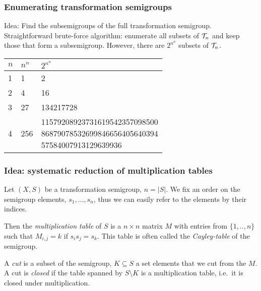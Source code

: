 \documentclass{beamer}
\newcommand{\cT}{{\cal T}}
\newcommand{\jump}{\vskip6pt}
\begin{document}
\begin{frame}\frametitle{Enumerating transformation semigroups}
Idea: Find the subsemigroups of the full transformation semigroup.
\jump
Straightforward brute-force algorithm: enumerate all subsets of $\cT_n$ and keep those that form a subsemigroup.
\jump
However, there are $2^{n^n}$ subsets of $\cT_n$.
\begin{center}
\renewcommand{\arraystretch}{1.5}

\begin{tabular}{l|l|l}
$n$&$n^n$&$2^{n^n}$\\
\hline
1 & 1 & 2 \\
\hline
2 & 4 & 16 \\
\hline
3 & 27 & 134217728 \\
\hline\hline\hline
4 & 256 & \parbox[l]{.5\textwidth}{11579208923731619542357098500\\86879078532699846656405640394\\57584007913129639936}\\
 & 3125 & $2^{3125}$
\end{tabular}
\end{center}
\end{frame}

\begin{frame}\frametitle{Idea: systematic reduction of multiplication tables}
Let $(X,S)$ be a transformation semigroup, $n=|S|$. We fix an order on the semigroup elements, $s_1,\ldots, s_n$, thus we can easily refer to the elements by their indices. 
\begin{definition}
Then the  \emph{multiplication table} of $S$ is a $n\times n$ matrix $M$ with entries from $\{1,..,n\}$ such that $M_{i,j}=k$ if $s_is_j=s_k$. This table is often called the \emph{Cayley-table} of the semigroup.
\end{definition}

\begin{definition}
A \emph{cut} is a subset of the semigroup, $K\subseteq S$ a set elements that we cut from the $M$.  A cut is \emph{closed} if the table spanned by $S\setminus K$ is a multiplication table, i.e.\ it is closed under multiplication.
\end{definition}
\end{frame}
\end{document}
